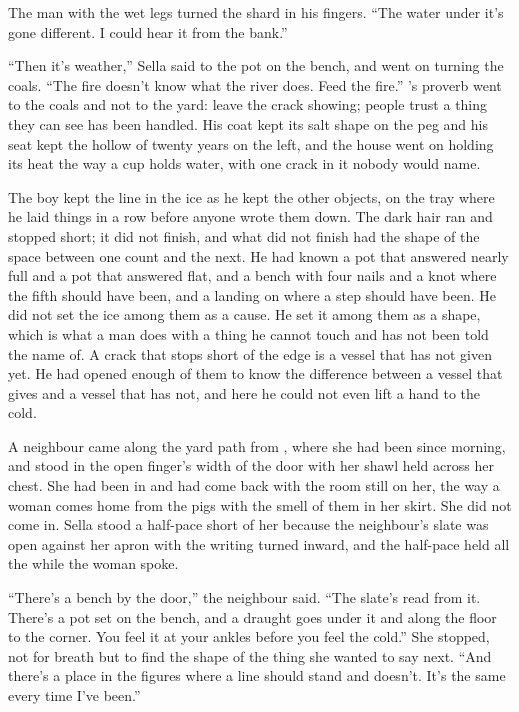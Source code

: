 The man with the wet legs turned the shard in his fingers. “The water under it's gone different. I could hear it from the bank.”

“Then it's weather,” Sella said to the pot on the bench, and went on turning the coals. “The fire doesn't know what the river does. Feed the fire.” 's proverb went to the coals and not to the yard: leave the crack showing; people trust a thing they can see has been handled. His coat kept its salt shape on the peg and his seat kept the hollow of twenty years on the left, and the house went on holding its heat the way a cup holds water, with one crack in it nobody would name.

The boy kept the line in the ice as he kept the other objects, on the tray where he laid things in a row before anyone wrote them down. The dark hair ran and stopped short; it did not finish, and what did not finish had the shape of the space between one count and the next. He had known a pot that answered nearly full and a pot that answered flat, and a bench with four nails and a knot where the fifth should have been, and a landing on  where a step should have been. He did not set the ice among them as a cause. He set it among them as a shape, which is what a man does with a thing he cannot touch and has not been told the name of. A crack that stops short of the edge is a vessel that has not given yet. He had opened enough of them to know the difference between a vessel that gives and a vessel that has not, and here he could not even lift a hand to the cold.

\scenebreak

A neighbour came along the yard path from , where she had been since morning, and stood in the open finger's width of the door with her shawl held across her chest. She had been in  and had come back with the room still on her, the way a woman comes home from the pigs with the smell of them in her skirt. She did not come in. Sella stood a half-pace short of her because the neighbour's slate was open against her apron with the writing turned inward, and the half-pace held all the while the woman spoke.

“There's a bench by the door,” the neighbour said. “The slate's read from it. There's a pot set on the bench, and a draught goes under it and along the floor to the corner. You feel it at your ankles before you feel the cold.” She stopped, not for breath but to find the shape of the thing she wanted to say next. “And there's a place in the figures where a line should stand and doesn't. It's the same every time I've been.”

